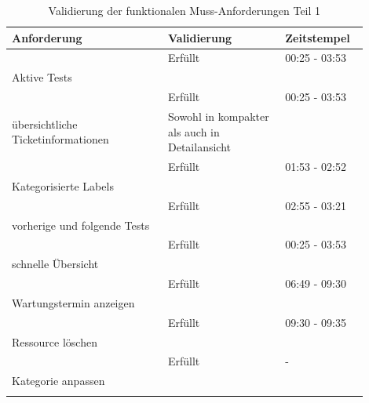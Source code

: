 \begin{longtable}{| P{0.4\linewidth} | P{0.3\linewidth} | P{0.2\linewidth} |} 
  \hline
  \textbf{Anforderung} & \textbf{Validierung} & \textbf{Zeitstempel}\\ [0.5ex]  \hline
  
   & Erfüllt & 00:25 - 03:53 \\
  Aktive Tests & & \\ [0.5ex] \hline

   & Erfüllt & 00:25 - 03:53 \\
  übersichtliche Ticketinformationen & Sowohl in kompakter als auch in Detailansicht & \\ [0.5ex] \hline

   & Erfüllt & 01:53 - 02:52 \\
  Kategorisierte Labels &  & \\ [0.5ex] \hline

   & Erfüllt & 02:55 - 03:21 \\
  vorherige und folgende Tests &  & \\ [0.5ex] \hline

   & Erfüllt & 00:25 - 03:53 \\
  schnelle Übersicht &  & \\ [0.5ex] \hline

   & Erfüllt & 06:49 - 09:30 \\
  Wartungstermin anzeigen &  & \\ [0.5ex] \hline

   & Erfüllt & 09:30 - 09:35 \\
  Ressource löschen &  & \\ [0.5ex] \hline

   & Erfüllt & - \\
  Kategorie anpassen &  & \\ [0.5ex] \hline
  \caption{Validierung der funktionalen Muss-Anforderungen Teil 1}\label{tab:mussvalidierung}
\end{longtable}

